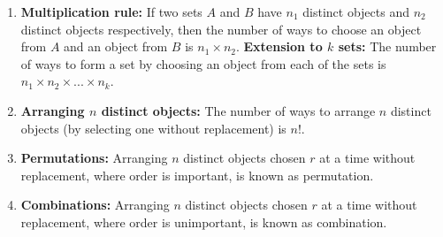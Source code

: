 \begin{enumerate}
    \item \textbf{Multiplication rule:} If two sets $A$ and $B$ have $n_1$ distinct objects and $n_2$ distinct objects respectively, then the number of ways to choose an object from $A$ and an object from $B$ is $n_1 \times n_2$.
        \subitem \textbf{Extension to $k$ sets:} The number of ways to form a set by choosing an object from each of the sets is $n_1 \times n_2 \times ... \times n_k$.
    \item \textbf{Arranging $n$ distinct objects:} The number of ways to arrange $n$ distinct objects (by selecting one without replacement) is $n!$.
    \item \textbf{Permutations:} Arranging $n$ distinct objects chosen $r$ at a time without replacement, where order is important, is known as permutation.


    \item \textbf{Combinations:} Arranging $n$ distinct objects chosen $r$ at a time without replacement, where order is unimportant, is known as combination.


    
\end{enumerate}



